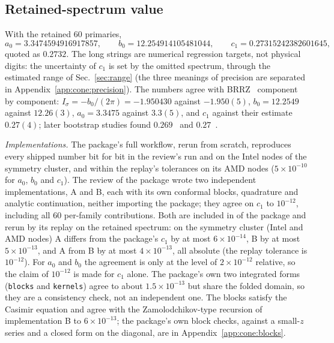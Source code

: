 \documentclass[11pt,a4paper]{article}
\numberwithin{equation}{section}
\newcommand{\file}[1]{\path{#1}}
\newcommand{\sci}[2]{#1\times10^{#2}}
\begin{document}
\subsection{Retained-spectrum value}\label{sec:retained}
With the retained 60 primaries,
\begin{equation}
 a_0=3.3474594916917857,\qquad b_0=12.254914105481044,\qquad c_1=0.27315242382601645,
\end{equation}
quoted as $0.2732$. The long strings are numerical regression targets, not physical digits: the uncertainty of $c_1$ is
set by the omitted spectrum, through the estimated range of Sec.~\ref{sec:range} (the three meanings of precision
are separated in Appendix~\ref{app:cone:precision}). The numbers agree with
BRRZ~\cite{Behan:2017dwr,Behan:2017emf} component by component: $I_\sigma=-b_0/(2\pi)=-1.950430$ against $-1.950(5)$,
$b_0=12.2549$ against $12.26(3)$, $a_0=3.3475$ against $3.3(5)$, and $c_1$ against their estimate $0.27(4)$; later
bootstrap studies found $0.269$~\cite{Behan:2018hfx} and $0.27$~\cite{Behan:2023ile}.

\emph{Implementations.} The package's full workflow, rerun from scratch, reproduces every shipped number bit for bit in
the review's run and on the Intel nodes of the symmetry cluster, and within the replay's tolerances on its AMD nodes
($\sci{5}{-10}$ for $a_0$, $b_0$ and $c_1$). The review of the package wrote two independent implementations, A and B,
each with its own conformal blocks, quadrature and analytic continuation, neither importing the package; they agree on
$c_1$ to $10^{-12}$, including all 60 per-family contributions. Both are included in \file{review_indep/} of the package
and rerun by its replay on the retained spectrum: on the symmetry cluster (Intel and AMD nodes) A differs from the
package's $c_1$ by at most $\sci{6}{-14}$, B by at most $\sci{5}{-13}$, and A from B by at most $\sci{4}{-13}$, all
absolute (the replay tolerance is $10^{-12}$). For $a_0$ and $b_0$ the agreement is only at the level of
$\sci{2}{-12}$ relative, so the claim of $10^{-12}$ is made for $c_1$ alone. The package's own two integrated forms
(\texttt{blocks} and \texttt{kernels}) agree to about $\sci{1.5}{-13}$ but share the folded domain, so they are a
consistency check, not an independent one. The blocks satisfy the Casimir equation and agree with the
Zamolodchikov-type recursion of implementation B to $\sci{6}{-13}$; the package's own block checks, against a small-$z$
series and a closed form on the diagonal, are in Appendix~\ref{app:cone:blocks}.
\end{document}
